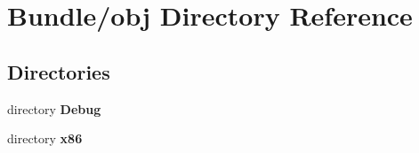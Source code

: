 \section{Bundle/obj Directory Reference}
\label{dir_227ae7b0c74470f0ca469b12ab5f251d}
\subsection*{Directories}
\begin{DoxyCompactItemize}
\item 
directory {\bf Debug}
\item 
directory {\bf x86}
\end{DoxyCompactItemize}
